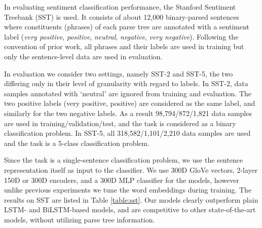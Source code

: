 \documentclass[wcp]{jmlr}
\begin{document}
    In evaluating sentiment classification performance, the Stanford Sentiment Treebank (SST) \citep{socher2013recursive} is used.
    It consists of about 12,000 binary-parsed sentences where constituents (phrases) of each parse tree are annotated with a sentiment label (\textit{very positive}, \textit{positive}, \textit{neutral}, \textit{negative}, \textit{very negative}).
    Following the convention of prior work, all phrases and their labels are used in training but only the sentence-level data are used in evaluation.
    
    In evaluation we consider two settings, namely SST-2 and SST-5, the two differing only in their level of granularity with regard to labels.
    In SST-2, data samples annotated with `neutral' are ignored from training and evaluation.
    The two positive labels (very positive, positive) are considered as the same label, and similarly for the two negative labels.
    As a result 98,794/872/1,821 data samples are used in training/validation/test, and the task is considered as a binary classification problem.
    In SST-5, all 318,582/1,101/2,210 data samples are used and the task is a 5-class classification problem.
    
    Since the task is a single-sentence classification problem, we use the sentence representation itself as input to the classifier.
    We use 300D GloVe vectors, 2-layer 150D or 300D encoders, and a 300D MLP classifier for the models,
    however unlike previous experiments we tune the word embeddings during training.
    The results on SST are listed in Table \ref{table:sst}.
    Our models clearly outperform plain LSTM- and BiLSTM-based models, and are competitive to other state-of-the-art models, without utilizing parse tree information.
    
\end{document}
